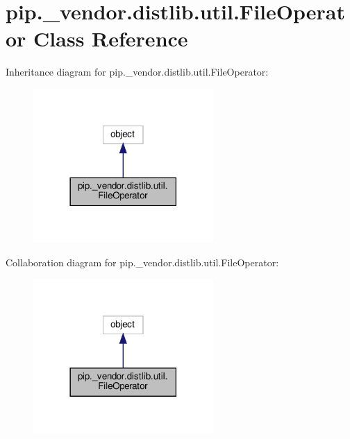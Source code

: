 \hypertarget{classpip_1_1__vendor_1_1distlib_1_1util_1_1FileOperator}{}\section{pip.\+\_\+vendor.\+distlib.\+util.\+File\+Operator Class Reference}
\label{classpip_1_1__vendor_1_1distlib_1_1util_1_1FileOperator}


Inheritance diagram for pip.\+\_\+vendor.\+distlib.\+util.\+File\+Operator\+:
\nopagebreak
\begin{figure}[H]
\begin{center}
\leavevmode
\includegraphics[width=194pt]{classpip_1_1__vendor_1_1distlib_1_1util_1_1FileOperator__inherit__graph}
\end{center}
\end{figure}


Collaboration diagram for pip.\+\_\+vendor.\+distlib.\+util.\+File\+Operator\+:
\nopagebreak
\begin{figure}[H]
\begin{center}
\leavevmode
\includegraphics[width=194pt]{classpip_1_1__vendor_1_1distlib_1_1util_1_1FileOperator__coll__graph}
\end{center}
\end{figure}
